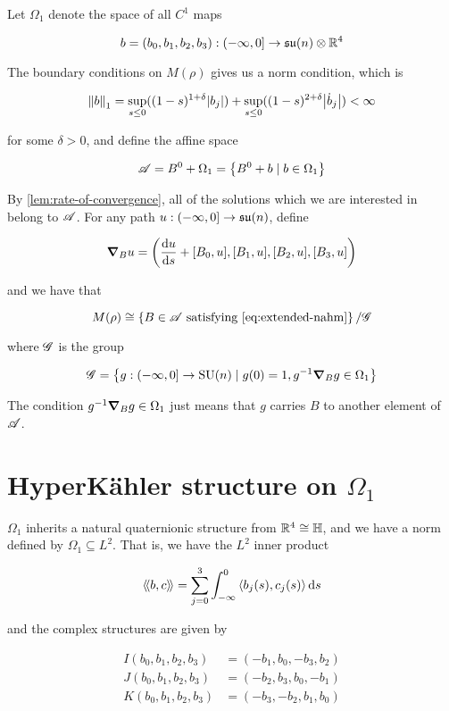 \documentclass{report}
\DeclareMathOperator{\SU}{SU}
\newcommand{\su}{\mathfrak{su}}
\newcommand{\iinner}[1]{\left\langle\!\left\langle #1 \right\rangle\!\right\rangle}
\begin{document}
Let \(\Omega_1\) denote the space of all \(C^1\) maps

\[b = (b_0, b_1, b_2, b_3) : \Ioc{-\infty, 0} \to \su(n) \otimes \R^4\]

The boundary conditions on \(M(\rho)\) gives us a norm condition, which is

\[\norm{b}_1 = \sup_{s \le 0}((1-s)^{1+\delta}\abs{b_j}) + \sup_{s\le0}((1-s)^{2+\delta}\abs{\dot b_j}) < \infty\]

for some \(\delta > 0\), and define the affine space

\[\mathscr{A} = B^0 + \Omega_1 = \left\{B^0 + b \mid b \in \Omega_1\right\}\]

By \cref{lem:rate-of-convergence}, all of the solutions which we are interested in belong to \(\mathscr{A}\). For any path \(u : \Ioc{-\infty, 0} \to \su(n)\), define

\[\grad_B u = \left(\dv{u}{s} + [B_0, u], [B_1, u], [B_2, u], [B_3, u]\right)\]

and we have that \cite[Proposition 3.7]{kronheimer_hyper-kahlerian_1990}

\[M(\rho) \cong \left\{B \in \msA \text{ satisfying \cref{eq:extended-nahm}}\right\}/\msG\]

where \(\mathscr{G}\) is the group

\[\msG = \left\{g : \Ioc{-\infty, 0} \to \SU(n) \mid g(0) = 1, g^{-1}\grad_Bg \in \Omega_1\right\}\]

The condition \(g^{-1}\grad_Bg \in \Omega_1\) just means that \(g\) carries \(B\) to another element of \(\mathscr{A}\).

\section{HyperK\"ahler structure on \(\Omega_1\)}

\(\Omega_1\) inherits a natural quaternionic structure from \(\mathbb{R}^4 \cong \mathbb{H}\), and we have a norm defined by \(\Omega_1 \subseteq L^2\). That is, we have the \(L^2\) inner product

\[\iinner{b, c} = \sum_{j=0}^3\int_{-\infty}^0 \inner{b_j(s), c_j(s)}\dd s\]

and the complex structures are given by

\begin{align*}
    I(b_0, b_1, b_2, b_3) &= (-b_1, b_0, -b_3, b_2) \\
    J(b_0, b_1, b_2, b_3) &= (-b_2, b_3, b_0, -b_1) \\
    K(b_0, b_1, b_2, b_3) &= (-b_3, -b_2, b_1, b_0)
\end{align*}
\end{document}
